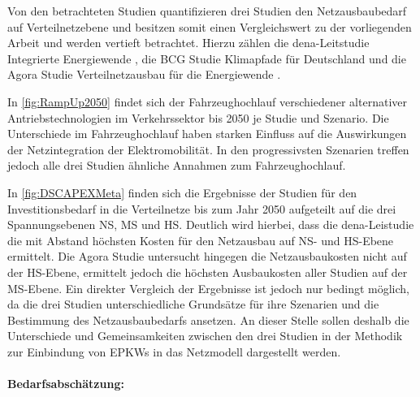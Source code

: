 Von den betrachteten Studien quantifizieren drei Studien den Netzausbaubedarf auf Verteilnetzebene und besitzen somit einen Vergleichswert zu der vorliegenden Arbeit und werden vertieft betrachtet.
Hierzu zählen die dena-Leitstudie \glqq Integrierte Energiewende\grqq{} \cite{DEAGH2018}, die BCG Studie \glqq Klimapfade für Deutschland\grqq{} \cite{BCG2018} und die Agora Studie \glqq Verteilnetzausbau für die Energiewende\grqq{} \cite{Agora2019}.



In \autoref{fig:RampUp2050} findet sich der Fahrzeughochlauf verschiedener alternativer Antriebstechnologien im Verkehrssektor bis \num{2050} je Studie und Szenario.
Die Unterschiede im Fahrzeughochlauf haben starken Einfluss auf die Auswirkungen der Netzintegration der Elektromobilität.
In den progressivsten Szenarien treffen jedoch alle drei Studien ähnliche Annahmen zum Fahrzeughochlauf.



In \autoref{fig:DSCAPEXMeta} finden sich die Ergebnisse der Studien für den Investitionsbedarf in die Verteilnetze bis zum Jahr \num{2050} aufgeteilt auf die drei Spannungsebenen \gls{NS}, \gls{MS} und \gls{HS}.
Deutlich wird hierbei, dass die dena-Leistudie die mit Abstand höchsten Kosten für den Netzausbau auf \gls{NS}- und \gls{HS}-Ebene ermittelt.
Die Agora Studie untersucht hingegen die Netzausbaukosten nicht auf der \gls{HS}-Ebene, ermittelt jedoch die höchsten Ausbaukosten aller Studien auf der \gls{MS}-Ebene.
Ein direkter Vergleich der Ergebnisse ist jedoch nur bedingt möglich, da die drei Studien unterschiedliche Grundsätze für ihre Szenarien und die Bestimmung des Netzausbaubedarfs ansetzen.
An dieser Stelle sollen deshalb die Unterschiede und Gemeinsamkeiten zwischen den drei Studien in der Methodik zur Einbindung von \glspl{EPKW} in das Netzmodell dargestellt werden.


\paragraph{Bedarfsabschätzung:}


